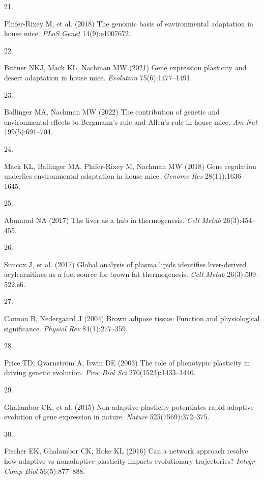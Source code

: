 \documentclass[9pt,twocolumn,twoside,lineno]{pnas-new}
\newlength{\cslhangindent}
\newlength{\csllabelwidth}
\newlength{\cslentryspacingunit} %
\newenvironment{CSLReferences}[2] %
 {%
  \setlength{\parindent}{0pt}
  \ifodd #1
  \let\oldpar\par
  \def\par{\hangindent=\cslhangindent\oldpar}
  \fi
  \setlength{\parskip}{#2\cslentryspacingunit}
 }%
 {}
\newcommand{\CSLLeftMargin}[1]{\parbox[t]{\csllabelwidth}{#1}}
\newcommand{\CSLRightInline}[1]{\parbox[t]{\linewidth - \csllabelwidth}{#1}\break}
\begin{document}
\begin{CSLReferences}{0}{0}
\leavevmode{}%
\CSLLeftMargin{21. }%
\CSLRightInline{Phifer-Rixey M, et al. (2018) The genomic basis of
environmental adaptation in house mice. \emph{PLoS Genet}
14(9):e1007672.}

\leavevmode{}%
\CSLLeftMargin{22. }%
\CSLRightInline{Bittner NKJ, Mack KL, Nachman MW (2021) Gene expression
plasticity and desert adaptation in house mice. \emph{Evolution}
75(6):1477--1491.}

\leavevmode{}%
\CSLLeftMargin{23. }%
\CSLRightInline{Ballinger MA, Nachman MW (2022) The contribution of
genetic and environmental effects to {Bergmann's} rule and {Allen's}
rule in house mice. \emph{Am Nat} 199(5):691--704.}

\leavevmode{}%
\CSLLeftMargin{24. }%
\CSLRightInline{Mack KL, Ballinger MA, Phifer-Rixey M, Nachman MW (2018)
Gene regulation underlies environmental adaptation in house mice.
\emph{Genome Res} 28(11):1636--1645.}

\leavevmode{}%
\CSLLeftMargin{25. }%
\CSLRightInline{Abumrad NA (2017) The liver as a hub in thermogenesis.
\emph{Cell Metab} 26(3):454--455.}

\leavevmode{}%
\CSLLeftMargin{26. }%
\CSLRightInline{Simcox J, et al. (2017) Global analysis of plasma lipids
identifies {liver-derived} acylcarnitines as a fuel source for brown fat
thermogenesis. \emph{Cell Metab} 26(3):509--522.e6.}

\leavevmode{}%
\CSLLeftMargin{27. }%
\CSLRightInline{Cannon B, Nedergaard J (2004) Brown adipose tissue:
Function and physiological significance. \emph{Physiol Rev}
84(1):277--359.}

\leavevmode{}%
\CSLLeftMargin{28. }%
\CSLRightInline{Price TD, Qvarnström A, Irwin DE (2003) The role of
phenotypic plasticity in driving genetic evolution. \emph{Proc Biol Sci}
270(1523):1433--1440.}

\leavevmode{}%
\CSLLeftMargin{29. }%
\CSLRightInline{Ghalambor CK, et al. (2015) Non-adaptive plasticity
potentiates rapid adaptive evolution of gene expression in nature.
\emph{Nature} 525(7569):372--375.}

\leavevmode{}%
\CSLLeftMargin{30. }%
\CSLRightInline{Fischer EK, Ghalambor CK, Hoke KL (2016) Can a network
approach resolve how adaptive vs nonadaptive plasticity impacts
evolutionary trajectories? \emph{Integr Comp Biol} 56(5):877--888.}


\end{CSLReferences}
\end{document}
